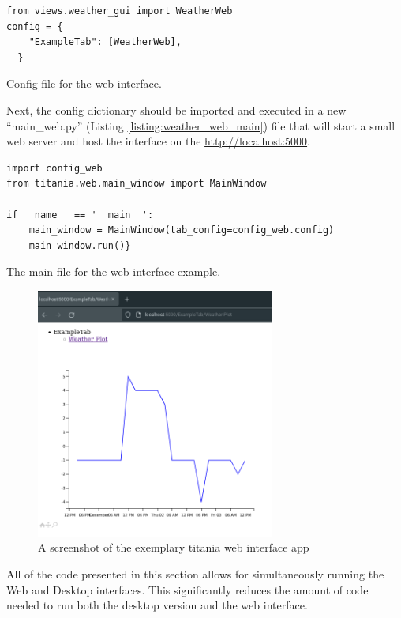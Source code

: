 \begin{listing}[!ht]
\begin{verbatim}
from views.weather_gui import WeatherWeb
config = {
    "ExampleTab": [WeatherWeb],
  }
\end{verbatim}
\caption{Config file for the web interface.}
\label{listing:weather_web_config}
\end{listing}

Next, the config dictionary should be imported and executed in a new ``main\_web.py'' (Listing \ref{listing:weather_web_main}) file that will start a small web server and host the interface on the \href{http://localhost:5000}{http://localhost:5000}.

\begin{listing}[!ht]
\begin{verbatim}
import config_web
from titania.web.main_window import MainWindow

if __name__ == '__main__':
    main_window = MainWindow(tab_config=config_web.config)
    main_window.run()}
\end{verbatim}
\caption{The main file for the web interface example.}
\label{listing:weather_web_main}
\end{listing}


\begin{figure}[H]
\centering
\includegraphics[width=0.7\textwidth]{figures/chapter5/titania/titania_weather_web.png}
\caption{A screenshot of the exemplary titania web interface app }
\label{fig:titaniawebinterface}
\end{figure}

All of the code presented in this section allows for simultaneously running the Web and Desktop interfaces.
This significantly reduces the amount of code needed to run both the desktop version and the web interface.

